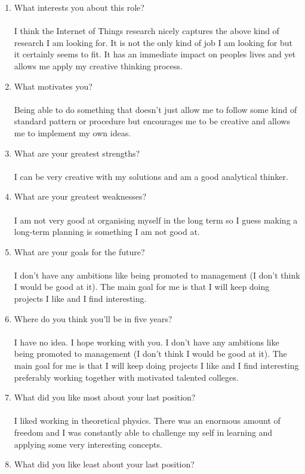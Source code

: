 \documentclass[12pt,a4paper,twoside]{article}
\begin{document}
\begin{enumerate}
		\item What interests you about this role?\\\\
		I think the Internet of Things research nicely captures the above kind of research I am looking for. It is not the only kind of job I am looking for but it certainly seems to fit. It has an immediate impact on peoples lives and yet allows me apply my creative thinking process.
		\item What motivates you?\\\\
		Being able to do something that doesn't just allow me to follow some kind of standard pattern or procedure but encourages me to be creative and allows me to implement my own ideas.
		\item What are your greatest strengths?\\\\
		I can be very creative with my solutions and am a good analytical thinker.
		\item What are your greatest weaknesses?\\\\
		I am not very good at organising myself in the long term so I guess making a long-term planning is something I am not good at.
		\item What are your goals for the future?\\\\
		I don't have any ambitions like being promoted to management (I don't think I would be good at it). The main goal for me is that I will keep doing projects I like and I find interesting.
		\item Where do you think you'll be in five years?\\\\
		I have no idea. I hope working with you. I don't have any ambitions like being promoted to management (I don't think I would be good at it). The main goal for me is that I will keep doing projects I like and I find interesting preferably working together with motivated talented colleges.
		\item What did you like most about your last position?\\\\
		I liked working in theoretical physics. There was an enormous amount of freedom and I was constantly able to challenge my self in learning and applying some very interesting concepts.
		\item What did you like least about your last position?\\\\

\end{enumerate}
\end{document}
